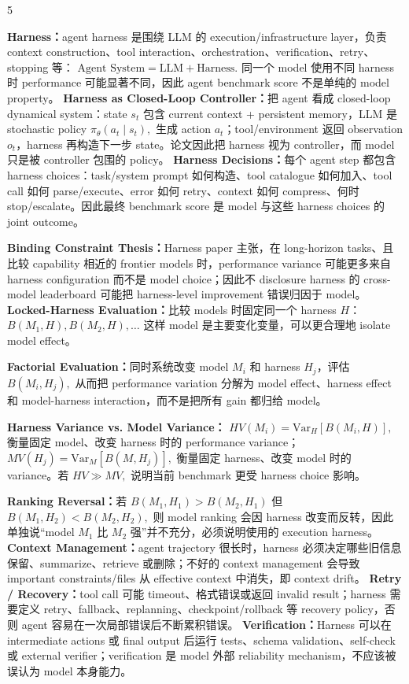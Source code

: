 \documentclass[a4paper, landscape]{article}
\begin{document}
\begin{multicols}{5}
\par \textbf{Harness：}agent harness 是围绕 LLM 的 execution/infrastructure layer，负责 context construction、tool interaction、orchestration、verification、retry、stopping 等：
\(
\text{Agent System}=\text{LLM}+\text{Harness}.
\)
同一个 model 使用不同 harness 时 performance 可能显著不同，因此 agent benchmark score 不是单纯的 model property。
\textbf{Harness as Closed-Loop Controller：}把 agent 看成 closed-loop dynamical system：state \(s_t\) 包含 current context + persistent memory，LLM 是 stochastic policy
\(
\pi_\theta(a_t\mid s_t),
\)
生成 action \(a_t\)；tool/environment 返回 observation \(o_t\)，harness 再构造下一步 state。论文因此把 harness 视为 controller，而 model 只是被 controller 包围的 policy。
\textbf{Harness Decisions：}每个 agent step 都包含 harness choices：task/system prompt 如何构造、tool catalogue 如何加入、tool call 如何 parse/execute、error 如何 retry、context 如何 compress、何时 stop/escalate。因此最终 benchmark score 是 model 与这些 harness choices 的 joint outcome。

\par \textbf{Binding Constraint Thesis：}Harness paper 主张，在 long-horizon tasks、且比较 capability 相近的 frontier models 时，performance variance 可能更多来自 harness configuration 而不是 model choice；因此不 disclosure harness 的 cross-model leaderboard 可能把 harness-level improvement 错误归因于 model。
\textbf{Locked-Harness Evaluation：}比较 models 时固定同一个 harness \(H\)：
\(
B(M_1,H),B(M_2,H),\ldots
\)
这样 model 是主要变化变量，可以更合理地 isolate model effect。

\par \textbf{Factorial Evaluation：}同时系统改变 model \(M_i\) 和 harness \(H_j\)，评估
\(
B(M_i,H_j),
\)
从而把 performance variation 分解为 model effect、harness effect 和 model-harness interaction，而不是把所有 gain 都归给 model。

\par \textbf{Harness Variance vs. Model Variance：}
\(
HV(M_i)=\mathrm{Var}_{H}[B(M_i,H)],
\)
衡量固定 model、改变 harness 时的 performance variance；
\(
MV(H_j)=\mathrm{Var}_{M}[B(M,H_j)],
\)
衡量固定 harness、改变 model 时的 variance。若
\(
HV\gg MV,
\)
说明当前 benchmark 更受 harness choice 影响。

\par \textbf{Ranking Reversal：}若
\(
B(M_1,H_1)>B(M_2,H_1)
\)
但
\(
B(M_1,H_2)<B(M_2,H_2),
\)
则 model ranking 会因 harness 改变而反转，因此单独说“model \(M_1\) 比 \(M_2\) 强”并不充分，必须说明使用的 execution harness。
\textbf{Context Management：}agent trajectory 很长时，harness 必须决定哪些旧信息保留、summarize、retrieve 或删除；不好的 context management 会导致 important constraints/files 从 effective context 中消失，即 context drift。
\textbf{Retry / Recovery：}tool call 可能 timeout、格式错误或返回 invalid result；harness 需要定义 retry、fallback、replanning、checkpoint/rollback 等 recovery policy，否则 agent 容易在一次局部错误后不断累积错误。
\textbf{Verification：}Harness 可以在 intermediate actions 或 final output 后运行 tests、schema validation、self-check 或 external verifier；verification 是 model 外部 reliability mechanism，不应该被误认为 model 本身能力。


\end{multicols}
\end{document}
